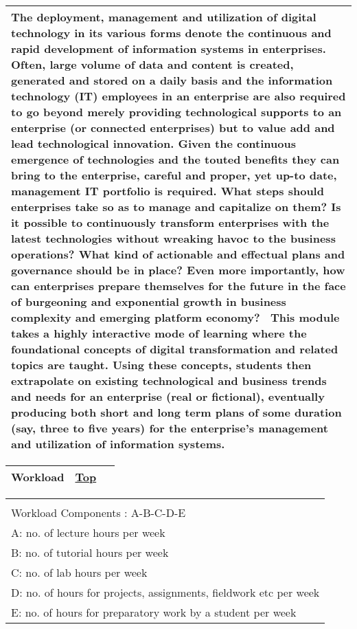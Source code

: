 \begin{longtable}[]{@{}l@{}}
\toprule
\protect\hypertarget{ctl00_ctl00_ContentPlaceHolder1_ContentPlaceHolder1_LV_CourseInfo_ctrl2_lblCourseInfo}{}{The
deployment, management and utilization of digital technology in its
various forms denote the continuous and rapid development of information
systems in enterprises. Often, large volume of data and content is
created, generated and stored on a daily basis and the information
technology (IT) employees in an enterprise are also required to go
beyond merely providing technological supports to an enterprise (or
connected enterprises) but to value add and lead technological
innovation. Given the continuous emergence of technologies and the
touted benefits they can bring to the enterprise, careful and proper,
yet up-to date, management IT portfolio is required. What steps should
enterprises take so as to manage and capitalize on them? Is it possible
to continuously transform enterprises with the latest technologies
without wreaking havoc to the business operations? What kind of
actionable and effectual plans and governance should be in place? Even
more importantly, how can enterprises prepare themselves for the future
in the face of burgeoning and exponential growth in business complexity
and emerging platform economy? ~This module takes a highly interactive
mode of learning where the foundational concepts of digital
transformation and related topics are taught. Using these concepts,
students then extrapolate on existing technological and business trends
and needs for an enterprise (real or fictional), eventually producing
both short and long term plans of some duration (say, three to five
years) for the enterprise's management and utilization of information
systems.}\tabularnewline
\bottomrule
\end{longtable}

\begin{longtable}[]{@{}ll@{}}
\toprule
{\protect\hypertarget{Workload}{}{}Workload} &
{\protect\hyperlink{top}{Top}~~}\tabularnewline
\bottomrule
\end{longtable}

\begin{longtable}[]{@{}l@{}}
\toprule
\protect\hypertarget{ctl00_ctl00_ContentPlaceHolder1_ContentPlaceHolder1_LV_CourseInfo_ctrl3_lblCourseInfo}{}{2-0-0-4-4\\[2\baselineskip]Workload
Components : A-B-C-D-E\\
A: no. of lecture hours per week\\
B: no. of tutorial hours per week\\
C: no. of lab hours per week\\
D: no. of hours for projects, assignments, fieldwork etc per week\\
E: no. of hours for preparatory work by a student per
week}\tabularnewline
\bottomrule
\end{longtable}

